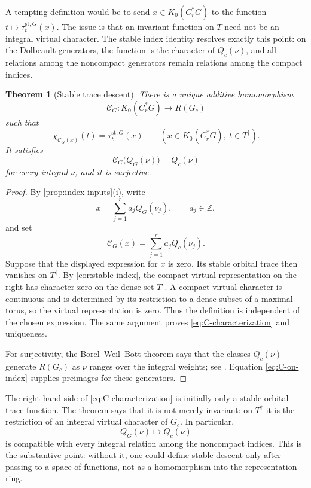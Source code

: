 \documentclass[11pt]{amsart}
\newtheorem{theorem}{Theorem}[section]
\theoremstyle{definition}
\theoremstyle{remark}
\newcommand{\Z}{\mathbb Z}
\newcommand{\Cr}{C_r^*}
\newcommand{\st}{\mathrm{st}}
\begin{document}
A tempting definition would be to send \(x\in K_0(\Cr G)\) to the function
\(t\mapsto\tau_t^{\mathrm{st},G}(x)\).  The issue is that an invariant function
on \(T\) need not be an integral virtual character.  The stable index identity
resolves exactly this point: on the Dolbeault generators, the function is the
character of \(Q_c(\nu)\), and all relations among the noncompact generators
remain relations among the compact indices.

\begin{theorem}[Stable trace descent]\label{thm:C-map}
There is a unique additive homomorphism
\[
  \mathcal C_G:K_0(\Cr G)\longrightarrow R(G_c)
\]
such that
\begin{equation}\label{eq:C-characterization}
  \chi_{\mathcal C_G(x)}(t)=\tau_t^{\st,G}(x)
  \qquad(x\in K_0(\Cr G),\ t\in T^\dagger).
\end{equation}
It satisfies
\begin{equation}\label{eq:C-on-index}
  \mathcal C_G\bigl(Q_G(\nu)\bigr)=Q_c(\nu)
\end{equation}
for every integral $\nu$, and it is surjective.
\end{theorem}

\begin{proof}
By \cref{prop:index-inputs}(i), write
\[
  x=\sum_{j=1}^r a_jQ_G(\nu_j),
  \qquad a_j\in\Z,
\]
and set
\[
  \mathcal C_G(x)=\sum_{j=1}^r a_jQ_c(\nu_j).
\]
Suppose that the displayed expression for $x$ is zero.  Its stable orbital trace then vanishes on $T^\dagger$.  By \cref{cor:stable-index}, the compact virtual representation on the right has character zero on the dense set $T^\dagger$.  A compact virtual character is continuous and is determined by its restriction to a dense subset of a maximal torus, so the virtual representation is zero.  Thus the definition is independent of the chosen expression.  The same argument proves \eqref{eq:C-characterization} and uniqueness.

For surjectivity, the Borel--Weil--Bott theorem says that the classes $Q_c(\nu)$ generate $R(G_c)$ as $\nu$ ranges over the integral weights; see \cite{Bott1957}.  Equation \eqref{eq:C-on-index} supplies preimages for these generators.
\end{proof}

The right-hand side of \eqref{eq:C-characterization} is initially only a stable orbital-trace function.  The theorem says that it is not merely invariant: on \(T^\dagger\) it is the restriction of an integral virtual character of \(G_c\).  In particular,
\[
  Q_G(\nu)\longmapsto Q_c(\nu)
\]
is compatible with every integral relation among the noncompact indices.  This is the substantive point: without it, one could define stable descent only after passing to a space of functions, not as a homomorphism into the representation ring.
\end{document}
